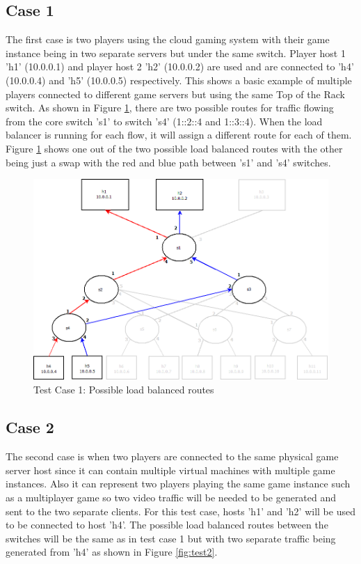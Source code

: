 \subsection{Case 1}
The first case is two players using the cloud gaming system with their game instance being in two separate servers but under the same switch. Player host 1 'h1' (10.0.0.1) and player host 2 'h2' (10.0.0.2) are used and are connected to 'h4' (10.0.0.4) and 'h5' (10.0.0.5) respectively. This shows a basic example of multiple players connected to different game servers but using the same Top of the Rack switch. As shown in Figure \ref{fig:test1}, there are two possible routes for traffic flowing from the core switch 's1' to switch 's4' (1::2::4 and 1::3::4). When the load balancer is running for each flow, it will assign a different route for each of them. Figure \ref{fig:test1} shows one out of the two possible load balanced routes with the other being just a swap with the red and blue path between 's1' and 's4' switches.

\begin{figure}[h!]
 \includegraphics[width=\linewidth]{images/test1.png}
 \caption{Test Case 1: Possible load balanced routes}
 \label{fig:test1}
\end{figure}

\subsection{Case 2}
The second case is when two players are connected to the same physical game server host since it can contain multiple virtual machines with multiple game instances. Also it can represent two players playing the same game instance such as a multiplayer game so two video traffic will be needed to be generated and sent to the two separate clients. For this test case, hosts 'h1' and 'h2' will be used to be connected to host 'h4'. The possible load balanced routes between the switches will be the same as in test case 1 but with two separate traffic being generated from 'h4' as shown in Figure \ref{fig:test2}.

